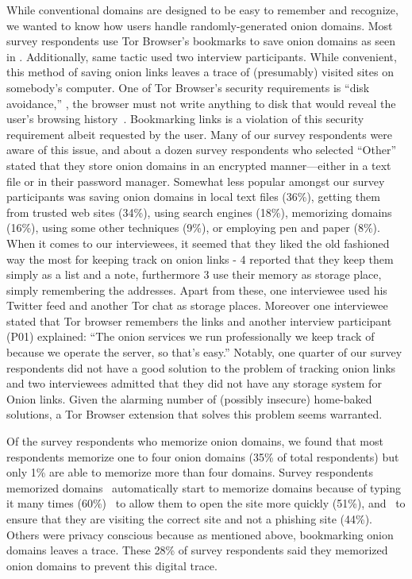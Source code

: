 While conventional domains are designed to be easy to remember and recognize, we
wanted to know how users handle randomly-generated onion domains. Most survey
respondents use Tor Browser's bookmarks to save onion domains as seen in
. Additionally, same tactic used two interview
participants.   While convenient, this method of saving onion links leaves a
trace of (presumably) visited sites on somebody's computer.  One of Tor
Browser's security requirements is ``disk avoidance,'' \ie, the browser must not
write anything to disk that would reveal the user's browsing
history~\cite[\S~2.1]{Perry2017a}.  Bookmarking links is a violation of this
security requirement albeit requested by the user.  Many of our survey
respondents were aware of this issue, and about a dozen survey respondents who
selected ``Other'' stated that they store onion domains in an encrypted
manner---either in a text file or in their password manager.  Somewhat less
popular amongst our survey participants was saving onion domains in local text
files (36\%), getting them from trusted web sites (34\%), using search engines
(18\%), memorizing domains (16\%), using some other techniques (9\%), or
employing pen and paper (8\%).  When it comes to our interviewees, it seemed
that they liked the old fashioned way the most for keeping track on onion links
- 4 reported that they keep them simply as a list and a note, furthermore 3 use
their memory as storage place, simply remembering the addresses. Apart from
these, one interviewee used his Twitter feed and another Tor chat as storage
places. Moreover one interviewee stated that Tor browser remembers the links and
another interview participant (P01) explained: ``The onion services we run
professionally we keep track of because we operate the server, so that's easy.''
Notably, one quarter of our survey respondents did not have a good solution to
the problem of tracking onion links and  two interviewees admitted that they did
not have any storage system for Onion links.  Given the alarming number of
(possibly insecure) home-baked solutions, a Tor Browser extension that solves
this problem seems warranted.

Of the survey respondents who memorize onion domains, we found that most
respondents memorize one to four onion domains (35\% of total respondents) but
only 1\% are able to memorize more than four domains.   Survey respondents
memorized domains \first~automatically start to memorize domains because of
typing it many times (60\%) \second~to allow them to open the site more quickly
(51\%), and \third~to ensure that they are visiting the correct site and not a
phishing site (44\%). Others were privacy conscious because as mentioned above,
bookmarking onion domains leaves a trace. These 28\% of survey respondents said
they memorized onion domains to prevent this digital trace.

